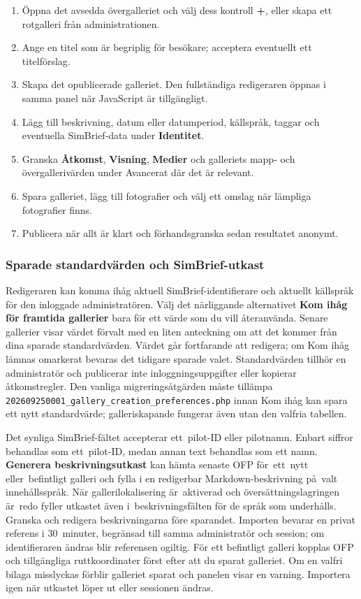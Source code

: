 \documentclass[11pt,a4paper]{article}
\newcommand{\ui}[1]{\textbf{#1}}
\newcommand{\codeword}[1]{\nolinkurl{#1}}
\begin{document}
\begin{enumerate}
  \item Öppna det avsedda övergalleriet och välj dess kontroll \ui{+}, eller
  skapa ett rotgalleri från administrationen.
  \item Ange en titel som är begriplig för besökare; acceptera eventuellt ett
  titelförslag.
  \item Skapa det opublicerade galleriet. Den fullständiga redigeraren öppnas i
  samma panel när JavaScript är tillgängligt.
  \item Lägg till beskrivning, datum eller datumperiod, källspråk, taggar och
  eventuella SimBrief-data under \ui{Identitet}.
  \item Granska \ui{Åtkomst}, \ui{Visning}, \ui{Medier} och galleriets mapp- och
  övergallerivärden under Avancerat där det är relevant.
  \item Spara galleriet, lägg till fotografier och välj ett omslag när lämpliga
  fotografier finns.
  \item Publicera när allt är klart och förhandsgranska sedan resultatet
  anonymt.
\end{enumerate}

\subsubsection{Sparade standardvärden och SimBrief-utkast}

Redigeraren kan komma ihåg aktuell SimBrief-identifierare och aktuellt källspråk
för den inloggade administratören. Välj det närliggande alternativet \ui{Kom
ihåg för framtida gallerier} bara för ett värde som du vill återanvända. Senare
gallerier visar värdet förvalt med en liten anteckning om att det kommer från
dina sparade standardvärden. Värdet går fortfarande att redigera; om Kom ihåg
lämnas omarkerat bevaras det tidigare sparade valet. Standardvärden tillhör en
administratör och publicerar inte inloggningsuppgifter eller kopierar
åtkomstregler. Den vanliga migreringsåtgärden måste tillämpa
\codeword{202609250001\_gallery\_creation\_preferences.php} innan Kom ihåg kan
spara ett nytt standardvärde; galleriskapande fungerar även utan den valfria
tabellen.

Det synliga SimBrief-fältet accepterar ett~pilot-ID eller pilotnamn. Enbart
siffror behandlas som ett~pilot-ID, medan annan text behandlas som ett namn.
\ui{Generera beskrivningsutkast} kan hämta senaste OFP för~ett~nytt
eller~befintligt galleri och fylla i en redigerbar Markdown-beskrivning på~valt
innehållsspråk. När gallerilokalisering är~aktiverad och översättningslagringen
är~redo fyller utkastet även i~beskrivningsfälten för de språk som underhålls.
Granska och redigera beskrivningarna före sparandet. Importen bevarar en privat
referens i 30~minuter, begränsad till samma administratör och session; om
identifieraren ändras blir referensen ogiltig. För ett befintligt galleri
kopplas OFP och tillgängliga ruttkoordinater först efter att du sparat
galleriet. Om en valfri bilaga misslyckas förblir galleriet sparat och panelen
visar en varning. Importera igen när utkastet löper ut eller sessionen ändras.
\end{document}
